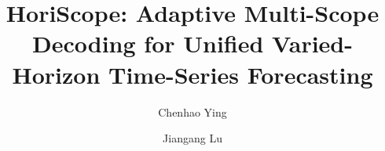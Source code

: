 \documentclass[final,3p,times]{elsarticle}
\begin{document}
\begin{frontmatter}



\title{HoriScope: Adaptive Multi-Scope Decoding for Unified Varied-Horizon Time-Series Forecasting}


\author{Chenhao Ying}
\author{Jiangang Lu}
\address{{State Key Laboratory of Industrial Control Technology, College of Control Science and Engineering, Zhejiang University},
            {Hangzhou},
            {310027}, 
            {Zhejiang},
            {China}}





\end{frontmatter}
\end{document}
